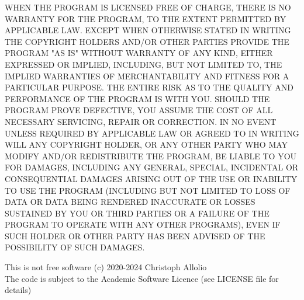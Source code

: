 \documentclass[11pt]{article}
\begin{document}
\noindent
\small{
WHEN THE PROGRAM IS LICENSED FREE OF CHARGE, THERE IS NO WARRANTY
FOR THE PROGRAM, TO THE EXTENT PERMITTED BY APPLICABLE LAW.  EXCEPT WHEN
OTHERWISE STATED IN WRITING THE COPYRIGHT HOLDERS AND/OR OTHER PARTIES
PROVIDE THE PROGRAM "AS IS" WITHOUT WARRANTY OF ANY KIND, EITHER EXPRESSED
OR IMPLIED, INCLUDING, BUT NOT LIMITED TO, THE IMPLIED WARRANTIES OF
MERCHANTABILITY AND FITNESS FOR A PARTICULAR PURPOSE.  THE ENTIRE RISK AS
TO THE QUALITY AND PERFORMANCE OF THE PROGRAM IS WITH YOU.  SHOULD THE
PROGRAM PROVE DEFECTIVE, YOU ASSUME THE COST OF ALL NECESSARY SERVICING,
REPAIR OR CORRECTION.
IN NO EVENT UNLESS REQUIRED BY APPLICABLE LAW OR AGREED TO IN WRITING
WILL ANY COPYRIGHT HOLDER, OR ANY OTHER PARTY WHO MAY MODIFY AND/OR
REDISTRIBUTE THE PROGRAM, BE LIABLE TO YOU FOR DAMAGES,
INCLUDING ANY GENERAL, SPECIAL, INCIDENTAL OR CONSEQUENTIAL DAMAGES ARISING
OUT OF THE USE OR INABILITY TO USE THE PROGRAM (INCLUDING BUT NOT LIMITED
TO LOSS OF DATA OR DATA BEING RENDERED INACCURATE OR LOSSES SUSTAINED BY
YOU OR THIRD PARTIES OR A FAILURE OF THE PROGRAM TO OPERATE WITH ANY OTHER
PROGRAMS), EVEN IF SUCH HOLDER OR OTHER PARTY HAS BEEN ADVISED OF THE
POSSIBILITY OF SUCH DAMAGES.}


\begin{tcolorbox}[colback=red!5!white,colframe=red!75!black,title=Warning]
This is not free software (c) 2020-2024 Christoph Allolio \\
The code is subject to the Academic Software Licence (see LICENSE file for details)
\end{tcolorbox}

    
\end{document}
